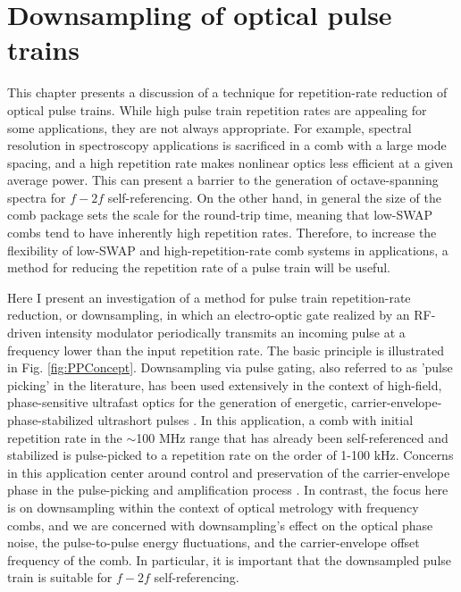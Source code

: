  \chapter{Downsampling of optical pulse trains} \label{chap:PulsePicking}
 

This chapter presents a discussion of a technique for repetition-rate reduction of optical pulse trains. While high pulse train repetition rates are appealing for some applications, they are not always appropriate. For example, spectral resolution in spectroscopy applications is sacrificed in a comb with a large mode spacing, and a high repetition rate makes nonlinear optics less efficient at a given average power. This can present a barrier to the generation of octave-spanning spectra for $f-2f$ self-referencing. On the other hand, in general the size of the comb package sets the scale for the round-trip time, meaning that low-SWAP combs tend to have inherently high repetition rates. Therefore, to increase the flexibility of low-SWAP and high-repetition-rate comb systems in applications, a method for reducing the repetition rate of a pulse train will be useful.

Here I present an investigation of a method for pulse train repetition-rate reduction, or downsampling, in which an electro-optic gate realized by an RF-driven intensity modulator periodically transmits an incoming pulse at a frequency lower than the input repetition rate. The basic principle is illustrated in Fig. \ref{fig:PPConcept}. Downsampling via pulse gating, also referred to as 'pulse picking' in the literature, has been used extensively in the context of high-field, phase-sensitive ultrafast optics for the generation of energetic, carrier-envelope-phase-stabilized ultrashort pulses \cite{Backus1998,Baltuska2003}. In this application, a comb with initial repetition rate in the $\sim$100 MHz range that has already been self-referenced and stabilized is pulse-picked to a repetition rate on the order of 1-100 kHz. Concerns in this application center around control and preservation of the carrier-envelope phase in the pulse-picking and amplification process \cite{Gohle2005,Rauschenberger2006}. In contrast, the focus here is on downsampling within the context of optical metrology with frequency combs, and we are concerned with downsampling's effect on the optical phase noise, the pulse-to-pulse energy fluctuations, and the carrier-envelope offset frequency of the comb. In particular, it is important that the downsampled pulse train is suitable for $f-2f$ self-referencing. 

